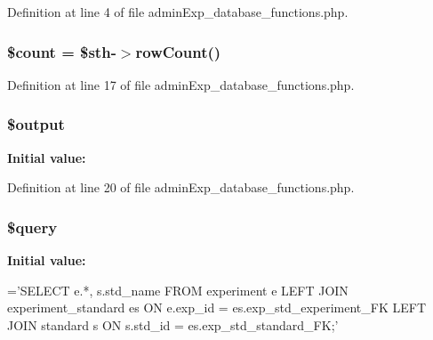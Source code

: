 Definition at line 4 of file admin\-Exp\-\_\-database\-\_\-functions.\-php.

\hypertarget{admin_exp__database__functions_8php_af789423037bbc89dc7c850e761177570}{
\subsubsection[{\$count}]{\setlength{\rightskip}{0pt plus 5cm}\$count = \$sth-\/$>$row\-Count()}}\label{admin_exp__database__functions_8php_af789423037bbc89dc7c850e761177570}


Definition at line 17 of file admin\-Exp\-\_\-database\-\_\-functions.\-php.

\hypertarget{admin_exp__database__functions_8php_a73004ce9cd673c1bfafd1dc351134797}{
\subsubsection[{\$output}]{\setlength{\rightskip}{0pt plus 5cm}\$output}}\label{admin_exp__database__functions_8php_a73004ce9cd673c1bfafd1dc351134797}
{\bfseries Initial value\-:}


Definition at line 20 of file admin\-Exp\-\_\-database\-\_\-functions.\-php.

\hypertarget{admin_exp__database__functions_8php_af59a5f7cd609e592c41dc3643efd3c98}{
\subsubsection[{\$query}]{\setlength{\rightskip}{0pt plus 5cm}\$query}}\label{admin_exp__database__functions_8php_af59a5f7cd609e592c41dc3643efd3c98}
{\bfseries Initial value\-:}
\begin{DoxyCode}
=\textcolor{stringliteral}{'SELECT e.*, s.std\_name }
\textcolor{stringliteral}{    FROM experiment e}
\textcolor{stringliteral}{    LEFT JOIN experiment\_standard es}
\textcolor{stringliteral}{    ON e.exp\_id = es.exp\_std\_experiment\_FK}
\textcolor{stringliteral}{    LEFT JOIN standard s }
\textcolor{stringliteral}{    ON s.std\_id = es.exp\_std\_standard\_FK;'}
\end{DoxyCode}


